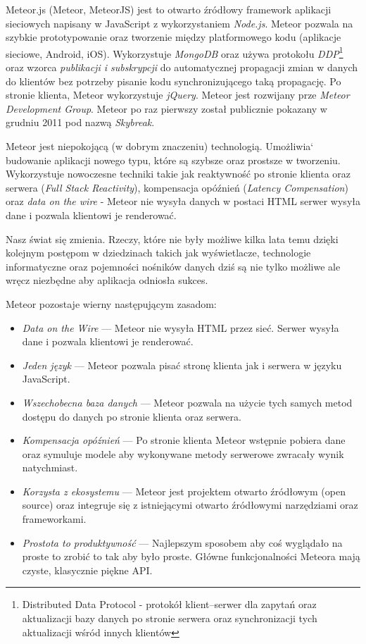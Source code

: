 Meteor.js (Meteor, MeteorJS) jest to otwarto źródłowy framework aplikacji sieciowych napisany w JavaScript z wykorzystaniem \emph{Node.js}. Meteor pozwala na szybkie prototypowanie oraz tworzenie między platformowego kodu (aplikacje sieciowe, Android, iOS). Wykorzystuje \emph{MongoDB} oraz używa protokołu \emph{DDP}\footnote{Distributed Data Protocol - protokół klient--serwer dla zapytań oraz aktualizacji bazy danych po stronie serwera oraz synchronizacji tych aktualizacji wśród innych klientów} oraz wzorca \emph{publikacji i subskrypcji} do automatycznej propagacji zmian w danych do klientów bez potrzeby pisanie kodu synchronizującego taką propagację. Po stronie klienta, Meteor wykorzystuje \emph{jQuery}. Meteor jest rozwijany prze \textit{Meteor Development Group}. Meteor po raz pierwszy został publicznie pokazany w grudniu 2011 pod nazwą \textit{Skybreak}\cite{meteorWiki}.

Meteor jest niepokojącą (w dobrym znaczeniu) technologią. Umożliwia` budowanie aplikacji nowego typu, które są szybsze oraz prostsze w tworzeniu. Wykorzystuje nowoczesne techniki takie jak reaktywność po stronie klienta oraz serwera (\textit{Full Stack Reactivity}), kompensacja opóźnień (\textit{Latency Compensation}) oraz \textit{data on the wire} - Meteor nie wysyła danych w postaci HTML serwer wysyła dane i pozwala klientowi je renderować\cite{strack15}.

Nasz świat się zmienia. Rzeczy, które nie były możliwe kilka lata temu dzięki kolejnym postępom w dziedzinach takich jak wyświetlacze, technologie informatyczne oraz pojemności nośników danych dziś są nie tylko możliwe ale wręcz niezbędne aby aplikacja odniosła sukces. 

Meteor pozostaje wierny następującym zasadom\cite{meteorDocs}: 
\begin{itemize}
 \item \textit{Data on the Wire} --- Meteor nie wysyła HTML przez sieć. Serwer wysyła dane i pozwala klientowi je renderować.
 \item \textit{Jeden język} --- Meteor pozwala pisać stronę klienta jak i serwera w języku JavaScript.
 \item \textit{Wszechobecna baza danych} --- Meteor pozwala na użycie tych samych metod dostępu do danych po stronie klienta oraz serwera.
 \item \textit{Kompensacja opóźnień} --- Po stronie klienta Meteor wstępnie pobiera dane oraz symuluje modele aby wykonywane metody serwerowe zwracały wynik natychmiast.
 \item \textit{Korzysta z ekosystemu} --- Meteor jest projektem otwarto źródłowym (open source) oraz integruje się z istniejącymi otwarto źródłowymi narzędziami oraz frameworkami.
 \item \textit{Prostota to produktywność} --- Najlepszym sposobem aby coś wyglądało na proste to zrobić to tak aby było proste. Główne funkcjonalności Meteora mają czyste, klasycznie piękne API.
\end{itemize}

